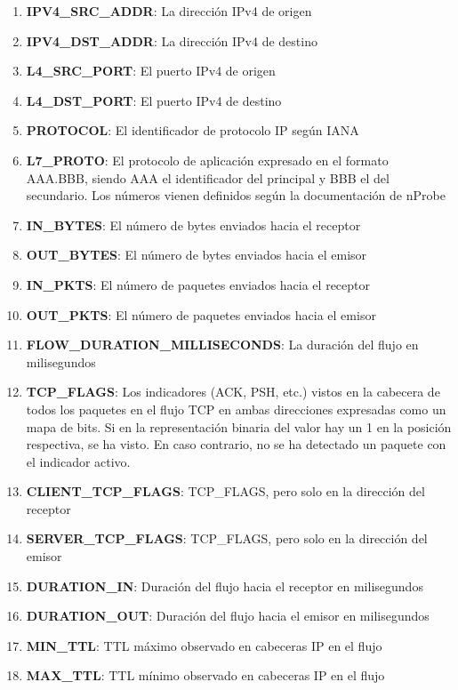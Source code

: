 \begin{enumerate}
    \item \textbf{IPV4\_SRC\_ADDR}: La dirección IPv4 de origen
    \item \textbf{IPV4\_DST\_ADDR}: La dirección IPv4 de destino
    \item \textbf{L4\_SRC\_PORT}: El puerto IPv4 de origen
    \item \textbf{L4\_DST\_PORT}: El puerto IPv4 de destino
    \item \textbf{PROTOCOL}: El identificador de protocolo IP según IANA \cite{ipprotocolnumbers}
    \item \textbf{L7\_PROTO}: El protocolo de aplicación expresado en el formato AAA.BBB, siendo AAA el identificador del principal y BBB el del secundario. Los números vienen definidos según la documentación de nProbe \cite{nprobe_documentation_proto_app}
    \item \textbf{IN\_BYTES}: El número de bytes enviados hacia el receptor
    \item \textbf{OUT\_BYTES}: El número de bytes enviados hacia el emisor
    \item \textbf{IN\_PKTS}: El número de paquetes enviados hacia el receptor
    \item \textbf{OUT\_PKTS}: El número de paquetes enviados hacia el emisor
    \item \textbf{FLOW\_DURATION\_MILLISECONDS}: La duración del flujo en milisegundos
    \item \textbf{TCP\_FLAGS}: Los indicadores (ACK, PSH, etc.) vistos en la cabecera de todos los paquetes en el flujo TCP en ambas direcciones expresadas como un mapa de bits. Si en la representación binaria del valor hay un 1 en la posición respectiva, se ha visto. En caso contrario, no se ha detectado un paquete con el indicador activo.
    \item \textbf{CLIENT\_TCP\_FLAGS}: TCP\_FLAGS, pero solo en la dirección del receptor
    \item \textbf{SERVER\_TCP\_FLAGS}: TCP\_FLAGS, pero solo en la dirección del emisor
    \item \textbf{DURATION\_IN}: Duración del flujo hacia el receptor en milisegundos
    \item \textbf{DURATION\_OUT}: Duración del flujo hacia el emisor en milisegundos
    \item \textbf{MIN\_TTL}: TTL máximo observado en cabeceras IP en el flujo
    \item \textbf{MAX\_TTL}: TTL mínimo observado en cabeceras IP en el flujo

\end{enumerate}
